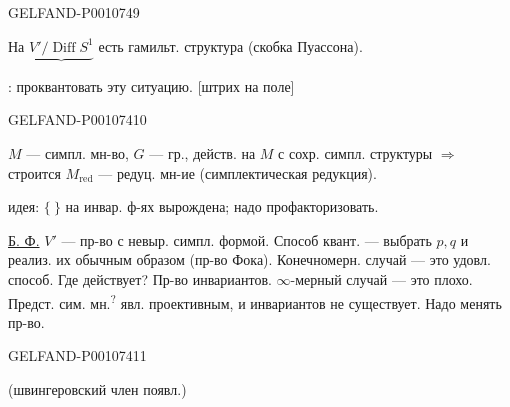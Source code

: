 \begin{GelfandAdjacentEvidence}{GELFAND-P001074}{9}


На $\underbrace{V'/\operatorname{Diff}S^1}$ есть гамильт. структура (скобка Пуассона).

: проквантовать эту ситуацию.
[штрих на поле]
\end{GelfandAdjacentEvidence}
\begin{GelfandAdjacentEvidence}{GELFAND-P001074}{10}


 $M$ — симпл. мн-во, $G$ — гр., действ. на $M$ с сохр. симпл. структуры $\Rightarrow$ строится $M_{\mathrm{red}}$ — редуц. мн-ие (симплектическая редукция).

идея: $\{\ \}$ на инвар. ф-ях вырождена; надо профакторизовать.

\uline{Б. Ф.} $V'$ — пр-во с невыр. симпл. формой.
Способ квант. — выбрать $p,q$ и реализ. их обычным образом (пр-во Фока).
Конечномерн. случай — это удовл. способ. Где действует? Пр-во инвариантов.
$\infty$-мерный случай — это плохо.
Предст. сим. мн.\textsuperscript{?} явл. проективным, и инвариантов не существует. Надо менять пр-во.
\end{GelfandAdjacentEvidence}
\begin{GelfandAdjacentEvidence}{GELFAND-P001074}{11}

(швингеровский член появл.)
\end{GelfandAdjacentEvidence}



